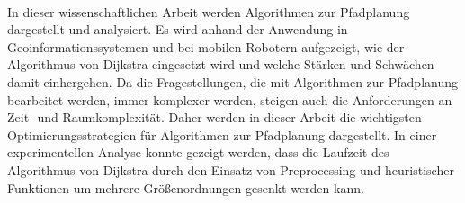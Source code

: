 \kurzfassung

\paragraph*{}
In dieser wissenschaftlichen Arbeit werden Algorithmen zur Pfadplanung dargestellt und analysiert. Es wird anhand der Anwendung in Geoinformationssystemen und bei mobilen Robotern aufgezeigt, wie der Algorithmus von Dijkstra eingesetzt wird und welche Stärken und Schwächen damit einhergehen.  Da die Fragestellungen, die mit Algorithmen zur Pfadplanung bearbeitet werden, immer komplexer werden, steigen auch die Anforderungen an Zeit- und Raumkomplexität. Daher werden in dieser Arbeit die wichtigsten Optimierungsstrategien für Algorithmen zur Pfadplanung dargestellt. In einer experimentellen Analyse konnte gezeigt werden, dass die Laufzeit des Algorithmus von Dijkstra durch den Einsatz von Preprocessing und heuristischer Funktionen um mehrere Größenordnungen gesenkt werden kann. 


